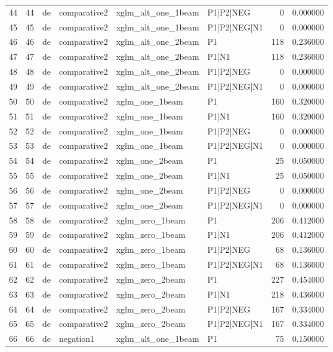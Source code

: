 \begin{tabular}{lrllllrr}
44 & 44 & de & comparative2 & xglm_alt_one_1beam & P1|P2|NEG & 0 & 0.000000 \\
45 & 45 & de & comparative2 & xglm_alt_one_1beam & P1|P2|NEG|N1 & 0 & 0.000000 \\
46 & 46 & de & comparative2 & xglm_alt_one_2beam & P1 & 118 & 0.236000 \\
47 & 47 & de & comparative2 & xglm_alt_one_2beam & P1|N1 & 118 & 0.236000 \\
48 & 48 & de & comparative2 & xglm_alt_one_2beam & P1|P2|NEG & 0 & 0.000000 \\
49 & 49 & de & comparative2 & xglm_alt_one_2beam & P1|P2|NEG|N1 & 0 & 0.000000 \\
50 & 50 & de & comparative2 & xglm_one_1beam & P1 & 160 & 0.320000 \\
51 & 51 & de & comparative2 & xglm_one_1beam & P1|N1 & 160 & 0.320000 \\
52 & 52 & de & comparative2 & xglm_one_1beam & P1|P2|NEG & 0 & 0.000000 \\
53 & 53 & de & comparative2 & xglm_one_1beam & P1|P2|NEG|N1 & 0 & 0.000000 \\
54 & 54 & de & comparative2 & xglm_one_2beam & P1 & 25 & 0.050000 \\
55 & 55 & de & comparative2 & xglm_one_2beam & P1|N1 & 25 & 0.050000 \\
56 & 56 & de & comparative2 & xglm_one_2beam & P1|P2|NEG & 0 & 0.000000 \\
57 & 57 & de & comparative2 & xglm_one_2beam & P1|P2|NEG|N1 & 0 & 0.000000 \\
58 & 58 & de & comparative2 & xglm_zero_1beam & P1 & 206 & 0.412000 \\
59 & 59 & de & comparative2 & xglm_zero_1beam & P1|N1 & 206 & 0.412000 \\
60 & 60 & de & comparative2 & xglm_zero_1beam & P1|P2|NEG & 68 & 0.136000 \\
61 & 61 & de & comparative2 & xglm_zero_1beam & P1|P2|NEG|N1 & 68 & 0.136000 \\
62 & 62 & de & comparative2 & xglm_zero_2beam & P1 & 227 & 0.454000 \\
63 & 63 & de & comparative2 & xglm_zero_2beam & P1|N1 & 218 & 0.436000 \\
64 & 64 & de & comparative2 & xglm_zero_2beam & P1|P2|NEG & 167 & 0.334000 \\
65 & 65 & de & comparative2 & xglm_zero_2beam & P1|P2|NEG|N1 & 167 & 0.334000 \\
66 & 66 & de & negation1 & xglm_alt_one_1beam & P1 & 75 & 0.150000 \\

\end{tabular}
